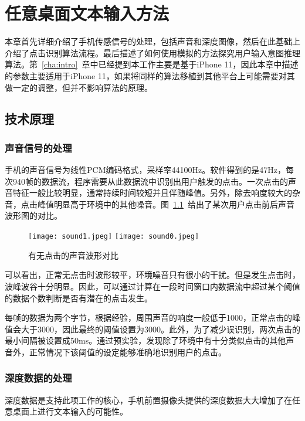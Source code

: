 \chapter{任意桌面文本输入方法}
\label{cha:sensing} 
本章首先详细介绍了手机传感信号的处理，包括声音和深度图像，然后在此基础上介绍了点击识别算法流程。最后描述了如何使用模拟的方法探究用户输入意图推理算法。第~\ref{cha:intro}~章中已经提到本工作主要是基于iPhone 11，因此本章中描述的参数主要适用于iPhone 11，如果将同样的算法移植到其他平台上可能需要对其做一定的调整，但并不影响算法的原理。

\section{技术原理}
\subsection{声音信号的处理}
手机的声音信号为线性PCM编码格式，采样率44100Hz。软件得到的是47Hz，每次940帧的数据流，程序需要从此数据流中识别出用户触发的点击。一次点击的声音特征一般比较明显，通常持续时间较短并且伴随峰值。另外，除去响度较大的杂音，点击峰值明显高于环境中的其他噪音。图~\ref{fig:sound-comp}~给出了某次用户点击前后声音波形图的对比。

\begin{figure}[h]
  \centering%
    {\texttt{[image: sound1.jpeg]}}%
  \hspace{4em}%
      {\texttt{[image: sound0.jpeg]}}
  \caption{有无点击的声音波形对比}
  \label{fig:sound-comp}
\end{figure}

可以看出，正常无点击时波形较平，环境噪音只有很小的干扰。但是发生点击时，波峰波谷十分明显。因此，可以通过计算在一段时间窗口内数据流中超过某个阈值的数据个数判断是否有潜在的点击发生。

每帧的数据为两个字节，根据经验，周围声音的响度一般低于1000，正常点击的峰值会大于3000，因此最终的阈值设置为3000。此外，为了减少误识别，两次点击的最小间隔被设置成50ms。通过预实验，发现除了环境中有十分类似点击的其他声音外，正常情况下该阈值的设定能够准确地识别用户的点击。

\subsection{深度数据的处理}
深度数据是支持此项工作的核心，手机前置摄像头提供的深度数据大大增加了在任意桌面上进行文本输入的可能性。

